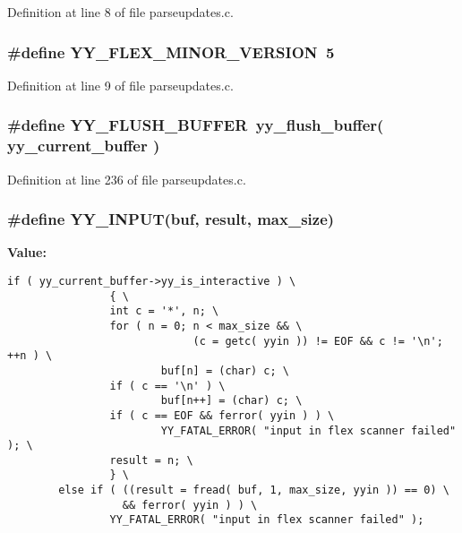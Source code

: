 Definition at line 8 of file parseupdates.c.
\subsubsection{\setlength{\rightskip}{0pt plus 5cm}\#define YY\_\-FLEX\_\-MINOR\_\-VERSION\ 5}\label{parseupdates_8c_a2}




Definition at line 9 of file parseupdates.c.
\subsubsection{\setlength{\rightskip}{0pt plus 5cm}\#define YY\_\-FLUSH\_\-BUFFER\ yy\_\-flush\_\-buffer( {\bf yy\_\-current\_\-buffer} )}\label{parseupdates_8c_a23}




Definition at line 236 of file parseupdates.c.
\subsubsection{\setlength{\rightskip}{0pt plus 5cm}\#define YY\_\-INPUT(buf, result, max\_\-size)}\label{parseupdates_8c_a51}


{\bf Value:}

\footnotesize\begin{verbatim}if ( yy_current_buffer->yy_is_interactive ) \
                { \
                int c = '*', n; \
                for ( n = 0; n < max_size && \
                             (c = getc( yyin )) != EOF && c != '\n'; ++n ) \
                        buf[n] = (char) c; \
                if ( c == '\n' ) \
                        buf[n++] = (char) c; \
                if ( c == EOF && ferror( yyin ) ) \
                        YY_FATAL_ERROR( "input in flex scanner failed" ); \
                result = n; \
                } \
        else if ( ((result = fread( buf, 1, max_size, yyin )) == 0) \
                  && ferror( yyin ) ) \
                YY_FATAL_ERROR( "input in flex scanner failed" );
\end{verbatim}\normalsize 


